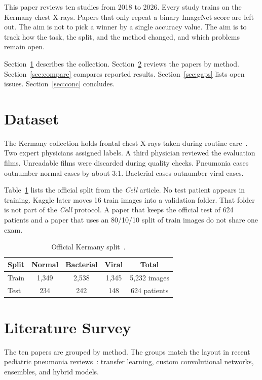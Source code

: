 \documentclass[conference]{IEEEtran}
\begin{document}
This paper reviews ten studies from 2018 to 2026. Every study trains on the Kermany chest X-rays. Papers that only repeat a binary ImageNet score are left out. The aim is not to pick a winner by a single accuracy value. The aim is to track how the task, the split, and the method changed, and which problems remain open.

Section~\ref{sec:data} describes the collection. Section~\ref{sec:survey} reviews the papers by method. Section~\ref{sec:compare} compares reported results. Section~\ref{sec:gaps} lists open issues. Section~\ref{sec:conc} concludes.

\section{Dataset}
\label{sec:data}
The Kermany collection holds frontal chest X-rays taken during routine care~\cite{kermany2018}. Two expert physicians assigned labels. A third physician reviewed the evaluation films. Unreadable films were discarded during quality checks. Pneumonia cases outnumber normal cases by about 3:1. Bacterial cases outnumber viral cases.

Table~\ref{tab:split} lists the official split from the \textit{Cell} article. No test patient appears in training. Kaggle later moves 16 train images into a validation folder. That folder is not part of the \textit{Cell} protocol. A paper that keeps the official test of 624 patients and a paper that uses an 80/10/10 split of train images do not share one exam.

\begin{table}[htbp]
\centering
\caption{Official Kermany split~\cite{kermany2018}.}
\label{tab:split}
\begin{tabular}{lcccc}
\toprule
\textbf{Split} & \textbf{Normal} & \textbf{Bacterial} & \textbf{Viral} & \textbf{Total} \\
\midrule
Train & 1{,}349 & 2{,}538 & 1{,}345 & 5{,}232 images \\
Test  & 234 & 242 & 148 & 624 patients \\
\bottomrule
\end{tabular}
\end{table}

\section{Literature Survey}
\label{sec:survey}
The ten papers are grouped by method. The groups match the layout in recent pediatric pneumonia reviews~\cite{raghaw2024,rahman2020}: transfer learning, custom convolutional networks, ensembles, and hybrid models.
\end{document}
